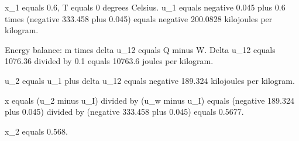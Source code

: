 x_1 equals 0.6, T equals 0 degrees Celsius.  
u_1 equals negative 0.045 plus 0.6 times (negative 333.458 plus 0.045) equals negative 200.0828 kilojoules per kilogram.  

Energy balance:  
m times delta u_12 equals Q minus W.  
Delta u_12 equals 1076.36 divided by 0.1 equals 10763.6 joules per kilogram.  

u_2 equals u_1 plus delta u_12 equals negative 189.324 kilojoules per kilogram.  

x equals (u_2 minus u_I) divided by (u_w minus u_I) equals (negative 189.324 plus 0.045) divided by (negative 333.458 plus 0.045) equals 0.5677.  

x_2 equals 0.568.
